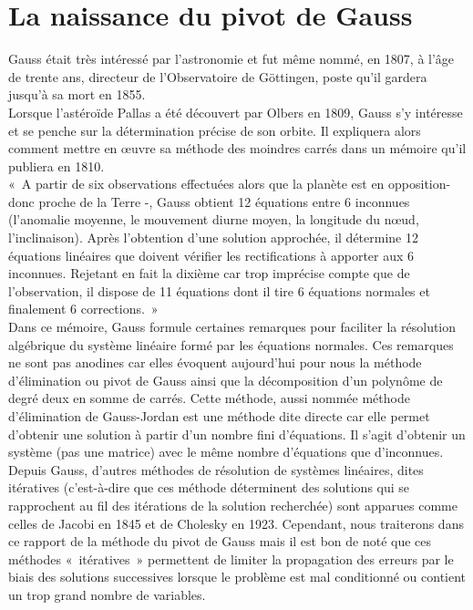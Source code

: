 \documentclass[a4paper,12pt]{report}
\begin{document}
\section{La naissance du pivot de Gauss}
Gauss était très intéressé par l’astronomie et fut même nommé, en 1807, à l’âge de trente ans, directeur de l’Observatoire de Göttingen, poste qu’il gardera jusqu’à sa mort en 1855. \\

Lorsque l’astéroïde Pallas a été découvert par Olbers en 1809, Gauss s’y intéresse et se penche sur la détermination précise de son orbite. Il expliquera alors comment mettre en œuvre sa méthode des moindres carrés dans un mémoire qu’il publiera en 1810.\\
« A partir de six observations effectuées alors que la planète est en opposition- donc proche de la Terre -, Gauss obtient 12 équations entre 6 inconnues (l’anomalie moyenne, le mouvement diurne moyen, la longitude du nœud, l’inclinaison). Après l’obtention d’une solution approchée, il détermine 12 équations linéaires que doivent vérifier les rectifications à apporter aux 6 inconnues.  Rejetant en fait la dixième car trop imprécise compte que de l’observation, il dispose de 11 équations dont il tire 6 équations normales et finalement 6 corrections. »\\

Dans ce mémoire, Gauss formule certaines remarques pour faciliter la résolution algébrique du système linéaire formé par les équations normales. Ces remarques ne sont pas anodines car elles évoquent aujourd’hui pour nous la méthode d’élimination ou pivot de Gauss ainsi que la décomposition d’un polynôme de degré deux en somme de carrés.
Cette méthode, aussi nommée méthode d’élimination de Gauss-Jordan est une méthode dite directe car elle permet d’obtenir une solution à partir d’un nombre fini d’équations. Il s’agit d’obtenir un système (pas une matrice) avec le même nombre d’équations que d’inconnues.\\

Depuis Gauss, d’autres méthodes de résolution de systèmes linéaires, dites itératives (c’est-à-dire que ces méthode déterminent des solutions qui se rapprochent au fil des itérations de la solution recherchée) sont apparues comme celles de Jacobi en 1845 et de Cholesky en 1923. Cependant, nous traiterons dans ce rapport de la méthode du pivot de Gauss mais il est bon de noté que ces méthodes « itératives » permettent de limiter la propagation des erreurs par le biais des solutions successives lorsque le problème est mal conditionné ou contient un trop grand nombre de variables.\\
\end{document}
